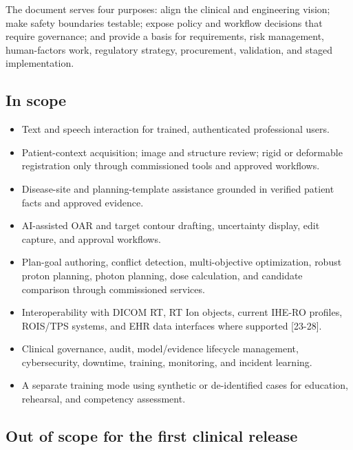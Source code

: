 \documentclass[11pt,letterpaper]{article}
\begin{document}
The document serves four purposes: align the clinical and engineering vision; make safety boundaries testable; expose policy and workflow decisions that require governance; and provide a basis for requirements, risk management, human-factors work, regulatory strategy, procurement, validation, and staged implementation.

\subsection{In scope}

\begin{itemize}
\item Text and speech interaction for trained, authenticated professional users.
\item Patient-context acquisition; image and structure review; rigid or deformable registration only through commissioned tools and approved workflows.
\item Disease-site and planning-template assistance grounded in verified patient facts and approved evidence.
\item AI-assisted OAR and target contour drafting, uncertainty display, edit capture, and approval workflows.
\item Plan-goal authoring, conflict detection, multi-objective optimization, robust proton planning, photon planning, dose calculation, and candidate comparison through commissioned services.
\item Interoperability with DICOM RT, RT Ion objects, current IHE-RO profiles, ROIS\slash\allowbreak{}TPS systems, and EHR data interfaces where supported [23-28].
\item Clinical governance, audit, model\slash\allowbreak{}evidence lifecycle management, cybersecurity, downtime, training, monitoring, and incident learning.
\item A separate training mode using synthetic or de-identified cases for education, rehearsal, and competency assessment.
\end{itemize}

\subsection{Out of scope for the first clinical release}
\end{document}
